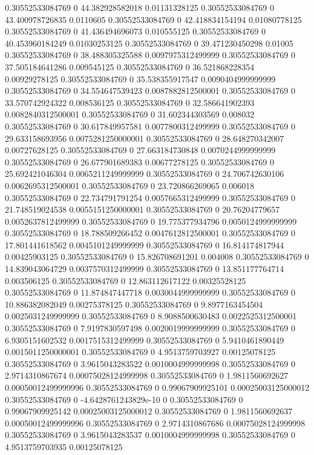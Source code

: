 0.30552533084769 0 44.382928582018 0.01131328125
0.30552533084769 0 43.400978726835 0.0110605
0.30552533084769 0 42.418834154194 0.01080778125
0.30552533084769 0 41.436494696073 0.010555125
0.30552533084769 0 40.453960184249 0.01030253125
0.30552533084769 0 39.471230450298 0.01005
0.30552533084769 0 38.488305325588 0.0097975312499999
0.30552533084769 0 37.505184641286 0.009545125
0.30552533084769 0 36.521868228354 0.00929278125
0.30552533084769 0 35.538355917547 0.0090404999999999
0.30552533084769 0 34.554647539423 0.0087882812500001
0.30552533084769 0 33.570742924322 0.008536125
0.30552533084769 0 32.586641902393 0.0082840312500001
0.30552533084769 0 31.602344303569 0.008032
0.30552533084769 0 30.617849957581 0.0077800312499999
0.30552533084769 0 29.633158693956 0.0075281250000001
0.30552533084769 0 28.648270342007 0.00727628125
0.30552533084769 0 27.663184730848 0.0070244999999999
0.30552533084769 0 26.677901689383 0.00677278125
0.30552533084769 0 25.692421046304 0.0065211249999999
0.30552533084769 0 24.706742630106 0.0062695312500001
0.30552533084769 0 23.720866269065 0.006018
0.30552533084769 0 22.734791791254 0.0057665312499999
0.30552533084769 0 21.748519024538 0.0055151250000001
0.30552533084769 0 20.76204779657 0.0052637812499999
0.30552533084769 0 19.775377934796 0.0050124999999999
0.30552533084769 0 18.788509266452 0.0047612812500001
0.30552533084769 0 17.801441618562 0.0045101249999999
0.30552533084769 0 16.814174817944 0.00425903125
0.30552533084769 0 15.826708691201 0.004008
0.30552533084769 0 14.839043064729 0.0037570312499999
0.30552533084769 0 13.851177764714 0.003506125
0.30552533084769 0 12.863112617122 0.00325528125
0.30552533084769 0 11.874847447718 0.0030044999999999
0.30552533084769 0 10.886382082049 0.00275378125
0.30552533084769 0 9.8977163454504 0.0025031249999999
0.30552533084769 0 8.9088500630483 0.0022525312500001
0.30552533084769 0 7.9197830597498 0.0020019999999999
0.30552533084769 0 6.9305151602532 0.0017515312499999
0.30552533084769 0 5.9410461890449 0.0015011250000001
0.30552533084769 0 4.9513759703927 0.00125078125
0.30552533084769 0 3.9615043283522 0.0010004999999998
0.30552533084769 0 2.9714310867674 0.00075028124999998
0.30552533084769 0 1.9811560692627 0.00050012499999996
0.30552533084769 0 0.99067909925101 0.00025003125000012
0.30552533084769 0 -4.6428761243829e-10 0
0.30552533084769 0 0.99067909925142 0.00025003125000012
0.30552533084769 0 1.9811560692637 0.00050012499999996
0.30552533084769 0 2.9714310867686 0.00075028124999998
0.30552533084769 0 3.9615043283537 0.0010004999999998
0.30552533084769 0 4.9513759703935 0.00125078125
